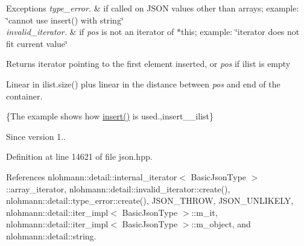 \begin{DoxyExceptions}{Exceptions}
{\em type\+\_\+error.} & if called on J\+S\+ON values other than arrays; example\+: {\ttfamily \char`\"{}cannot use insert() with string\char`\"{}} \\
\hline
{\em invalid\+\_\+iterator.} & if {\itshape pos} is not an iterator of $\ast$this; example\+: {\ttfamily \char`\"{}iterator does not fit current value\char`\"{}}\\
\hline
\end{DoxyExceptions}
\begin{DoxyReturn}{Returns}
iterator pointing to the first element inserted, or {\itshape pos} if {\ttfamily ilist} is empty
\end{DoxyReturn}
Linear in {\ttfamily ilist.\+size()} plus linear in the distance between {\itshape pos} and end of the container.

\{The example shows how {\ttfamily \hyperlink{classnlohmann_1_1basic__json_a0136728f5db69d4051c77b94307abd6c}{insert()}} is used.,insert\+\_\+\+\_\+ilist\}

\begin{DoxySince}{Since}
version 1.. 
\end{DoxySince}


Definition at line 14621 of file json.\+hpp.



References nlohmann\+::detail\+::internal\+\_\+iterator$<$ Basic\+Json\+Type $>$\+::array\+\_\+iterator, nlohmann\+::detail\+::invalid\+\_\+iterator\+::create(), nlohmann\+::detail\+::type\+\_\+error\+::create(), J\+S\+O\+N\+\_\+\+T\+H\+R\+OW, J\+S\+O\+N\+\_\+\+U\+N\+L\+I\+K\+E\+LY, nlohmann\+::detail\+::iter\+\_\+impl$<$ Basic\+Json\+Type $>$\+::m\+\_\+it, nlohmann\+::detail\+::iter\+\_\+impl$<$ Basic\+Json\+Type $>$\+::m\+\_\+object, and nlohmann\+::detail\+::string.


